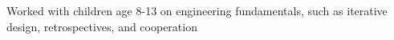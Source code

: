 \documentclass[]{csaund_resume-openfont}
\begin{document}
\begin{tightemize}
\item Worked with children age 8-13 on engineering fundamentals, such as iterative design, retrospectives, and cooperation
\end{tightemize}
\sectionsep
\end{document}
